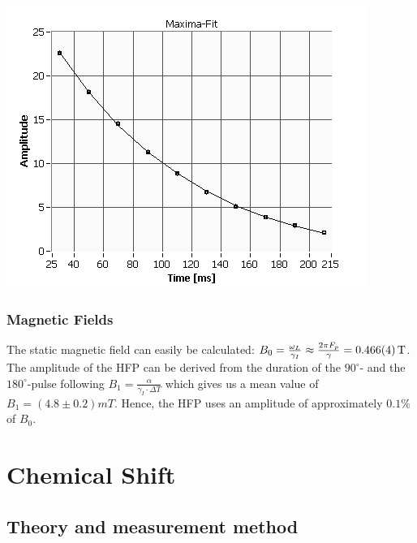 \documentclass[12pt, english]{scrartcl} %
\begin{document}
\begin{multicols}{2}
\begin{center}
\includegraphics[width=\columnwidth]{graphics/T2_probe1_CP.png}
\label{T2 by CP}
\end{center}

\subsubsection{Magnetic Fields}

The static magnetic field can easily be calculated: $B_0=\frac{\omega_L}{\gamma_I} \approx \frac{2\pi F_p}{\gamma}=\SI{0.466 \pm 0.004}{T}$. The amplitude of the HFP can be derived from the duration of the $90^\circ$- and the $180^\circ$-pulse following $B_1=\frac{\alpha}{\gamma_I \cdot \Delta T}$ which gives us a mean value of $B_1=(4.8\pm 0.2)mT$. Hence, the HFP uses an amplitude of approximately $0.1\%$ of $B_0$.

\newpage

\section{Chemical Shift}

\subsection{Theory and measurement method}


\end{multicols}
\end{document}
